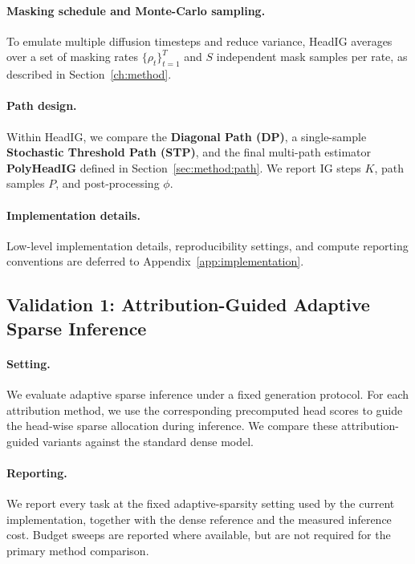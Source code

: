 \paragraph{Masking schedule and Monte-Carlo sampling.}
To emulate multiple diffusion timesteps and reduce variance, HeadIG averages over a set of masking rates $\{\rho_t\}_{t=1}^{T}$ and $S$ independent mask samples per rate, as described in Section~\ref{ch:method}.

\paragraph{Path design.}
Within HeadIG, we compare the \textbf{Diagonal Path (DP)}, a single-sample \textbf{Stochastic Threshold Path (STP)}, and the final multi-path estimator \textbf{PolyHeadIG} defined in Section~\ref{sec:method:path}. We report IG steps $K$, path samples $P$, and post-processing $\phi$.

\paragraph{Implementation details.}
Low-level implementation details, reproducibility settings, and compute reporting conventions are deferred to Appendix~\ref{app:implementation}.

\subsection{Validation 1: Attribution-Guided Adaptive Sparse Inference}
\label{sec:exp:adaptive}

\paragraph{Setting.}
We evaluate adaptive sparse inference under a fixed generation protocol. For each attribution method, we use the corresponding precomputed head scores to guide the head-wise sparse allocation during inference. We compare these attribution-guided variants against the standard dense model.

\paragraph{Reporting.}
We report every task at the fixed adaptive-sparsity setting used by the current implementation, together with the dense reference and the measured inference cost. Budget sweeps are reported where available, but are not required for the primary method comparison.

